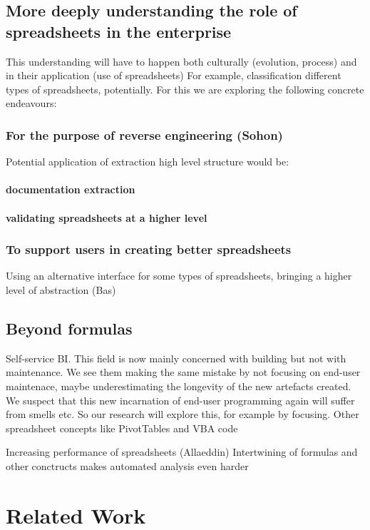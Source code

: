 \documentclass[conference]{IEEEtran}
\begin{document}
\subsection{More deeply understanding the role of spreadsheets in the enterprise}
This understanding will have to happen both culturally (evolution, process) and in their application (use of spreadsheets) For example, classification different types of spreadsheets, potentially. For this we are exploring the following concrete endeavours:

\subsubsection{For the purpose of reverse engineering (Sohon)}
Potential application of extraction high level structure would be:
\paragraph{documentation extraction}
\paragraph{validating spreadsheets at a higher level}

\subsubsection{To support users in creating better spreadsheets}
Using  an alternative interface for some types of spreadsheets, bringing a higher level of abstraction (Bas)

\subsection{Beyond formulas}

  Self-service BI. This field is now mainly concerned with building but not with maintenance. We see them making the same mistake by not focusing on end-user maintenace, maybe underestimating the longevity of the new artefacts created. We suspect that this new incarnation of end-user programming again will suffer from smells etc. So our research will explore this, for example by focusing. Other spreadsheet concepts like PivotTables and VBA code
  

Increasing performance of spreadsheets (Allaeddin)
Intertwining of formulas and other conctructs makes automated analysis even harder


\section{Related Work}
\end{document}
